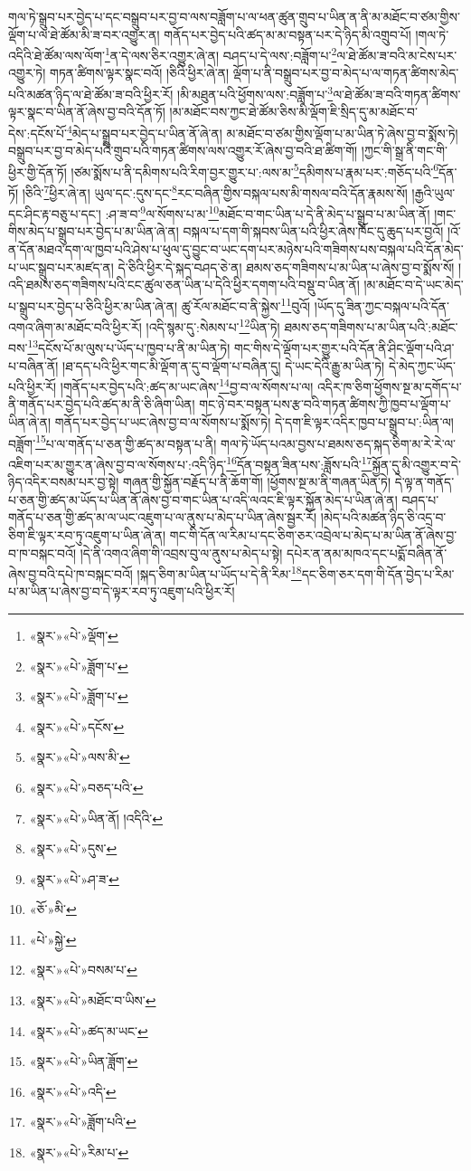 གལ་ཏེ་སྒྲུབ་པར་བྱེད་པ་དང་བསྒྲུབ་པར་བྱ་བ་ལས་བཟློག་པ་ལ་ཕན་ཚུན་གྲུབ་པ་ཡིན་ན་ནི་མ་མཐོང་བ་ཙམ་གྱིས་ལྡོག་པ་ལ་ཐེ་ཚོམ་མི་ཟ་བར་འགྱུར་ན། གནོད་པར་བྱེད་པའི་ཚད་མ་མ་བསྟན་པར་དེ་ཉིད་མི་འགྲུབ་པོ། །གལ་ཏེ་འདིའི་ཐེ་ཚོམ་ལས་ལོག་\footnote{«སྣར་»«པེ་»ལྡོག་}ན་དེ་ལས་ཅིར་འགྱུར་ཞེ་ན། བཤད་པ་དེ་ལས་:བཟློག་པ་\footnote{«སྣར་»«པེ་»ཟློག་པ་}ལ་ཐེ་ཚོམ་ཟ་བའི་མ་ངེས་པར་འགྱུར་ཏེ། གཏན་ཚིགས་ལྟར་སྣང་བའོ། །ཅིའི་ཕྱིར་ཞེ་ན། ལྡོག་པ་ནི་བསྒྲུབ་པར་བྱ་བ་མེད་པ་ལ་གཏན་ཚིགས་མེད་པའི་མཚན་ཉིད་ལ་ཐེ་ཚོམ་ཟ་བའི་ཕྱིར་རོ། །མི་མཐུན་པའི་ཕྱོགས་ལས་:བཟློག་པ་\footnote{«སྣར་»«པེ་»ཟློག་པ་}ལ་ཐེ་ཚོམ་ཟ་བའི་གཏན་ཚིགས་ལྟར་སྣང་བ་ཡིན་ནོ་ཞེས་བྱ་བའི་དོན་ཏོ། །མ་མཐོང་བས་ཀྱང་ཐེ་ཚོམ་ཅིས་མི་ལྡོག་ཇི་སྲིད་དུ་མ་མཐོང་བ་དེས་:དངོས་པོ་\footnote{«སྣར་»«པེ་»དངོས་}མེད་པ་སྒྲུབ་པར་བྱེད་པ་ཡིན་ནོ་ཞེ་ན། མ་མཐོང་བ་ཙམ་གྱིས་ལྡོག་པ་མ་ཡིན་ཏེ་ཞེས་བྱ་བ་སྨོས་ཏེ། བསྒྲུབ་པར་བྱ་བ་མེད་པའི་གྲུབ་པའི་གཏན་ཚིགས་ལས་འགྱུར་རོ་ཞེས་བྱ་བའི་ཐ་ཚིག་གོ། །ཀྱང་གི་སྒྲ་ནི་གང་གི་ཕྱིར་གྱི་དོན་ཏོ། །ཙམ་སྨོས་པ་ནི་དམིགས་པའི་རིག་བྱར་གྱུར་པ་:ལས་མ་\footnote{«སྣར་»«པེ་»ལས་མི་}དམིགས་པ་རྣམ་པར་:གཅོད་པའི་\footnote{«སྣར་»«པེ་»བཅད་པའི་}དོན་ཏོ། །ཅིའི་\footnote{«སྣར་»«པེ་»ཡིན་ནོ། །འདིའི་}ཕྱིར་ཞེ་ན། ཡུལ་དང་:དུས་དང་\footnote{«སྣར་»«པེ་»དུས་}རང་བཞིན་གྱིས་བསྐལ་པས་མི་གསལ་བའི་དོན་རྣམས་སོ། །རྒྱའི་ཡུལ་དང་ཤིང་རྟ་བཅུ་པ་དང་། :ཤ་ཟ་བ་\footnote{«སྣར་»«པེ་»ཤ་ཟ་}ལ་སོགས་པ་མ་\footnote{«ཅོ་»མི་}མཐོང་བ་གང་ཡིན་པ་དེ་ནི་མེད་པ་སྒྲུབ་པ་མ་ཡིན་ནོ། །གང་གིས་མེད་པ་སྒྲུབ་པར་བྱེད་པ་མ་ཡིན་ཞེ་ན། བསྐལ་པ་དག་གི་སྐབས་ཡིན་པའི་ཕྱིར་ཞེས་ཁོང་དུ་ཆུད་པར་བྱའོ། །འོ་ན་དོན་མཐའ་དག་ལ་ཁྱབ་པའི་ཤེས་པ་ཕུལ་དུ་བྱུང་བ་ཡང་དག་པར་མཉེས་པའི་གཟིགས་པས་བསྐལ་པའི་དོན་མེད་པ་ཡང་སྒྲུབ་པར་མཛད་ན། དེ་ཅིའི་ཕྱིར་དེ་སྐད་བཤད་ཅེ་ན། ཐམས་ཅད་གཟིགས་པ་མ་ཡིན་པ་ཞེས་བྱ་བ་སྨོས་སོ། །འདི་ཐམས་ཅད་གཟིགས་པའི་ངང་ཚུལ་ཅན་ཡིན་པ་དེའི་ཕྱིར་དགག་པའི་བསྡུ་བ་ཡིན་ནོ། །མ་མཐོང་བ་དེ་ཡང་མེད་པ་སྒྲུབ་པར་བྱེད་པ་ཅིའི་ཕྱིར་མ་ཡིན་ཞེ་ན། ཚུ་རོལ་མཐོང་བ་ནི་སྐྱེས་\footnote{«པེ་»སྐྱེ་}བུའོ། །ཡོད་དུ་ཟིན་ཀྱང་བསྐལ་པའི་དོན་འགའ་ཞིག་མ་མཐོང་བའི་ཕྱིར་རོ། །འདི་སྙམ་དུ་:སེམས་པ་\footnote{«སྣར་»«པེ་»བསམ་པ་}ཡིན་ཏེ། ཐམས་ཅད་གཟིགས་པ་མ་ཡིན་པའི་:མཐོང་བས་\footnote{«སྣར་»«པེ་»མཐོང་བ་ཡིས་}དངོས་པོ་མ་ལུས་པ་ཡོད་པ་ཁྱབ་པ་ནི་མ་ཡིན་ཏེ། གང་གིས་དེ་ལྡོག་པར་གྱུར་པའི་དོན་ནི་ཤིང་ལྡོག་པའི་ཤ་པ་བཞིན་ནོ། །ཐ་དད་པའི་ཕྱིར་གང་མི་ལྡོག་ན་དུ་བ་ལྡོག་པ་བཞིན་དུ། དེ་ཡང་དེའི་རྒྱུ་མ་ཡིན་ཏེ། དེ་མེད་ཀྱང་ཡོད་པའི་ཕྱིར་རོ། །གནོད་པར་བྱེད་པའི་:ཚད་མ་ཡང་ཞེས་\footnote{«སྣར་»«པེ་»ཚད་མ་ཡང་}བྱ་བ་ལ་སོགས་པ་ལ། འདིར་ཁ་ཅིག་ཕྱོགས་སྔ་མ་དགོད་པ་ནི་གནོད་པར་བྱེད་པའི་ཚད་མ་ནི་ཅི་ཞིག་ཡིན། གང་ཉེ་བར་བསྟན་པས་རྩ་བའི་གཏན་ཚིགས་ཀྱི་ཁྱབ་པ་ལྡོག་པ་ཡིན་ཞེ་ན། གནོད་པར་བྱེད་པ་ཡང་ཞེས་བྱ་བ་ལ་སོགས་པ་སྨོས་ཏེ། དེ་དག་ཇི་ལྟར་འདིར་ཁྱབ་པ་སྒྲུབ་པ་:ཡིན་ལ། བཟློག་\footnote{«སྣར་»«པེ་»ཡིན་ཟློག་}པ་ལ་གནོད་པ་ཅན་གྱི་ཚད་མ་བསྟན་པ་ནི། གལ་ཏེ་ཡོད་པའམ་བྱས་པ་ཐམས་ཅད་སྐད་ཅིག་མ་རེ་རེ་ལ་འཇིག་པར་མ་གྱུར་ན་ཞེས་བྱ་བ་ལ་སོགས་པ་:འདི་ཉིད་\footnote{«སྣར་»«པེ་»འདི་}དོན་བསྟན་ཟིན་པས་:ཟློས་པའི་\footnote{«སྣར་»«པེ་»ཟློག་པའི་}སྐྱོན་དུ་མི་འགྱུར་བ་དེ་ཉིད་འདིར་བསམ་པར་བྱ་སྟེ། གཞན་གྱི་སྐྱོན་བརྗོད་པ་ནི་ཆོག་གོ། །ཕྱོགས་སྔ་མ་ནི་གཞན་ཡིན་ཏེ། དེ་ལྟ་ན་གནོད་པ་ཅན་གྱི་ཚད་མ་ཡོད་པ་ཡིན་ནོ་ཞེས་བྱ་བ་གང་ཡིན་པ་འདི་ལའང་ཇི་ལྟར་སྐྱོན་མེད་པ་ཡིན་ཞེ་ན། བཤད་པ་གནོད་པ་ཅན་གྱི་ཚད་མ་ལ་ཡང་འཇུག་པ་ལ་ནུས་པ་མེད་པ་ཡིན་ཞེས་སྦྱར་རོ། །མེད་པའི་མཚན་ཉིད་ཅི་འདྲ་བ་ཅིག་ཇི་ལྟར་རབ་ཏུ་འཇུག་པ་ཡིན་ཞེ་ན། གང་གི་དོན་ལ་རིམ་པ་དང་ཅིག་ཅར་འབྲེལ་པ་མེད་པ་མ་ཡིན་ནོ་ཞེས་བྱ་བ་ཁ་བསྐང་བའོ། །དེ་ནི་འགའ་ཞིག་གི་འབྲས་བུ་ལ་ནུས་པ་མེད་པ་སྟེ། དཔེར་ན་ནམ་མཁའ་དང་པདྨོ་བཞིན་ནོ་ཞེས་བྱ་བའི་དཔེ་ཁ་བསྐང་བའོ། །སྐད་ཅིག་མ་ཡིན་པ་ཡོད་པ་དེ་ནི་རིམ་\footnote{«སྣར་»«པེ་»རིམ་པ་}དང་ཅིག་ཅར་དག་གི་དོན་བྱེད་པ་རིམ་པ་མ་ཡིན་པ་ཞེས་བྱ་བ་དེ་ལྟར་རབ་ཏུ་འཇུག་པའི་ཕྱིར་རོ། 